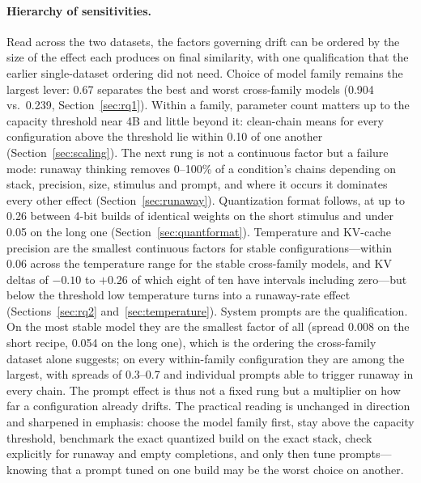 \documentclass[11pt]{article}
\begin{document}
\paragraph{Hierarchy of sensitivities.}
Read across the two datasets, the factors governing drift can be ordered by
the size of the effect each produces on final similarity, with one
qualification that the earlier single-dataset ordering did not need. Choice of
model family remains the largest lever: 0.67 separates the best and worst
cross-family models (0.904 vs.\ 0.239, Section~\ref{sec:rq1}). Within a
family, parameter count matters up to the capacity threshold near 4B and
little beyond it: clean-chain means for every configuration above the
threshold lie within 0.10 of one another (Section~\ref{sec:scaling}). The
next rung is not a continuous factor but a failure mode: runaway thinking
removes 0--100\% of a condition's chains depending on stack, precision,
size, stimulus and prompt, and where it occurs it dominates every other
effect (Section~\ref{sec:runaway}). Quantization format follows, at up to
0.26 between 4-bit builds of identical weights on the short stimulus and
under 0.05 on the long one (Section~\ref{sec:quantformat}). Temperature and
KV-cache precision are the smallest continuous factors for stable
configurations---within 0.06 across the temperature range for the stable
cross-family models, and KV deltas of $-0.10$ to $+0.26$ of which eight of
ten have intervals including zero---but below the threshold low temperature
turns into a runaway-rate effect (Sections~\ref{sec:rq2}
and~\ref{sec:temperature}). System prompts are the qualification. On the most
stable model they are the smallest factor of all (spread 0.008 on the short
recipe, 0.054 on the long one), which is the ordering the cross-family
dataset alone suggests; on every within-family configuration they are among
the largest, with spreads of 0.3--0.7 and individual prompts able to trigger
runaway in every chain. The prompt effect is thus not a fixed rung but a
multiplier on how far a configuration already drifts. The practical reading
is unchanged in direction and sharpened in emphasis: choose the model
family first, stay above the capacity threshold, benchmark the exact
quantized build on the exact stack, check explicitly for runaway and empty
completions, and only then tune prompts---knowing that a prompt tuned on one
build may be the worst choice on another.
\end{document}
